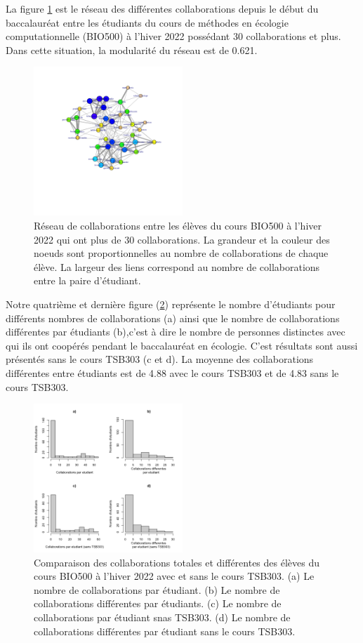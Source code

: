 \documentclass[9pt,twocolumn,twoside,]{pnas-new}
\begin{document}
La figure \ref{fig:plot3} est le réseau des différentes collaborations
depuis le début du baccalauréat entre les étudiants du cours de méthodes
en écologie computationnelle (BIO500) à l'hiver 2022 possédant 30
collaborations et plus. Dans cette situation, la modularité du réseau
est de 0.621.

\begin{figure}
\centering
\includegraphics[width=0.5\textwidth,height=0.4\textheight]{"../results/figure3.png"}
\caption{Réseau de collaborations entre les élèves du cours BIO500 à
l'hiver 2022 qui ont plus de 30 collaborations. La grandeur et la
couleur des noeuds sont proportionnelles au nombre de collaborations de
chaque élève. La largeur des liens correspond au nombre de
collaborations entre la paire d'étudiant. \label{fig:plot3}}
\end{figure}

Notre quatrième et dernière figure (\ref{fig:plot4}) représente le
nombre d'étudiants pour différents nombres de collaborations (a) ainsi
que le nombre de collaborations différentes par étudiants (b),c'est à
dire le nombre de personnes distinctes avec qui ils ont coopérés pendant
le baccalauréat en écologie. C'est résultats sont aussi présentés sans
le cours TSB303 (c et d). La moyenne des collaborations différentes
entre étudiants est de 4.88 avec le cours TSB303 et de 4.83 sans le
cours TSB303.

\begin{figure}
\centering
\includegraphics[width=0.5\textwidth,height=0.4\textheight]{"../results/figure4.png"}
\caption{Comparaison des collaborations totales et différentes des
élèves du cours BIO500 à l'hiver 2022 avec et sans le cours TSB303. (a)
Le nombre de collaborations par étudiant. (b) Le nombre de
collaborations différentes par étudiants. (c) Le nombre de
collaborations par étudiant snas TSB303. (d) Le nombre de collaborations
différentes par étudiant sans le cours TSB303. \label{fig:plot4}}
\end{figure}
\end{document}
